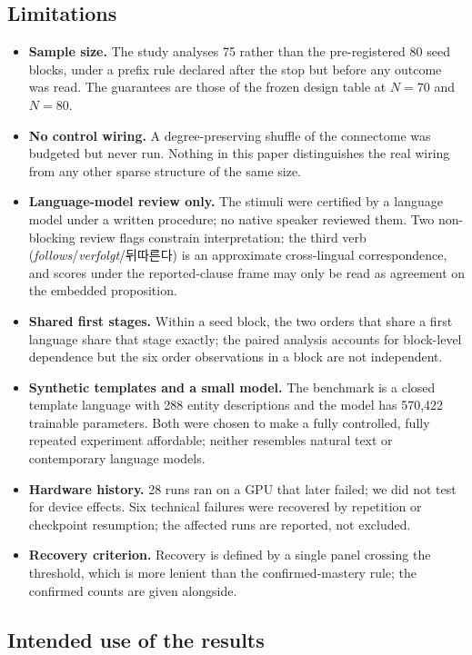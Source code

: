 \documentclass[preprint,12pt,authoryear]{elsarticle}
\begin{document}
\subsection{Limitations}
\label{sec:limitations}

\begin{itemize}
\item \textbf{Sample size.} The study analyses 75 rather than the pre-registered 80 seed blocks, under a prefix rule declared after the stop but before any outcome was read. The guarantees are those of the frozen design table at $N{=}70$ and $N{=}80$.
\item \textbf{No control wiring.} A degree-preserving shuffle of the connectome was budgeted but never run. Nothing in this paper distinguishes the real wiring from any other sparse structure of the same size.
\item \textbf{Language-model review only.} The stimuli were certified by a language model under a written procedure; no native speaker reviewed them. Two non-blocking review flags constrain interpretation: the third verb (\emph{follows}/\emph{verfolgt}/뒤따른다) is an approximate cross-lingual correspondence, and scores under the reported-clause frame may only be read as agreement on the embedded proposition.
\item \textbf{Shared first stages.} Within a seed block, the two orders that share a first language share that stage exactly; the paired analysis accounts for block-level dependence but the six order observations in a block are not independent.
\item \textbf{Synthetic templates and a small model.} The benchmark is a closed template language with 288 entity descriptions and the model has 570{,}422 trainable parameters. Both were chosen to make a fully controlled, fully repeated experiment affordable; neither resembles natural text or contemporary language models.
\item \textbf{Hardware history.} 28 runs ran on a GPU that later failed; we did not test for device effects. Six technical failures were recovered by repetition or checkpoint resumption; the affected runs are reported, not excluded.
\item \textbf{Recovery criterion.} Recovery is defined by a single panel crossing the threshold, which is more lenient than the confirmed-mastery rule; the confirmed counts are given alongside.
\end{itemize}

\subsection{Intended use of the results}
\end{document}
